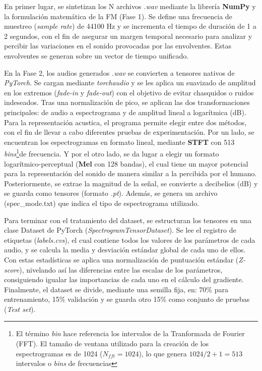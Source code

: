 En primer lugar, se sintetizan los N archivos \textit{.wav} mediante la librería \textbf{NumPy} y la formulación matemática de la FM (Fase 1). 
Se define una frecuencia de muestreo (\textit{sample rate}) de 44100 Hz
y se incrementa el tiempo de duración de 1 a 2 segundos, con el fin de asegurar un margen temporal
necesario para analizar y percibir las variaciones en el sonido provocadas por las envolventes. 
Estas envolventes se generan sobre un vector de tiempo unificado. 

En la Fase 2, los audios generados \textit{.wav} se convierten a tensores nativos de \textit{PyTorch}. Se cargan mediante \textit{torchaudio} y
se les aplica un suavizado de amplitud en los extremos (\textit{fade-in} y \textit{fade-out}) con el objetivo de 
evitar chasquidos o ruidos indeseados. Tras una normalización de pico, se aplican las dos transformaciones principales:
de audio a espectrograma y de amplitud lineal a logarítmica (dB). Para la representación acustica, el programa permite elegir
entre dos métodos, con el fin de llevar a cabo diferentes pruebas de experimentación. Por un lado, se encuentran 
los espectrogramas en formato lineal, mediante \textbf{STFT} con 513  \textit{bins}\footnote{El término \textit{bin} hace referencia los intervalos de la Tranformada de Fourier (FFT). 
El tamaño de ventana utilizado para la creación de los espectrogramas es de 1024 ($N_{fft} = 1024$), lo que genera
$1024 / 2 + 1 = 513$ intervalos o \textit{bins} de frecuencias}de frecuencia. Y por el otro lado, 
se da lugar a elegir un formato logarítmico-perceptual (\textbf{Mel} con 128 bandas), el cual tiene un mayor potencial para
la representación del sonido de manera similar a la percibida por el humano. Posteriormente, se extrae
la magnitud de la señal, se convierte a decibelios (dB) y se guarda como tensores (formato \textit{.pt}). Además,
se genera un archivo (spec\_mode.txt) que indica el tipo de espectrograma utilizado.

Para terminar con el tratamiento del dataset, se estructuran los tensores en una clase Dataset de PyTorch
(\textit{SpectrogramTensorDataset}). Se lee el registro de etiquetas (\textit{labels.cvs}), el cual contiene todos los
valores de los parámetros de cada audio, y se calcula la media y desviación estándar global de cada uno de ellos. Con estas estadísticas
se aplica una normalización de puntuación estándar (\textit{Z-score}), nivelando así las diferencias entre las escalas
de los parámetros, consiguiendo igualar las importancias de cada uno en el cálculo del gradiente.
Finalmente, el dataset se divide, mediante una semilla fija, en: 70\% para entrenamiento, 15\% validación y se guarda otro 15\%
como conjunto de pruebas (\textit{Test set}).

